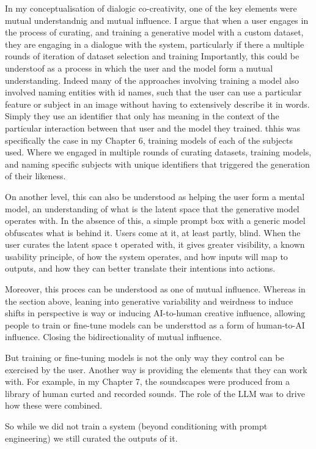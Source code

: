 In my conceptualisation of dialogic co-creativity, one of the key elements were mutual understandnig and mutual influence. I argue that when a user engages in the process of curating, and training a generative model with a custom dataset, they are engaging in a dialogue with the system, particularly if there a multiple rounds of iteration of dataset selection and training Importantly, this could be understoof as a process in which the user and the model form a mutual understanding. Indeed many of the approaches involving training a model also involved naming entities with id names, such that the user can use a particular feature or subject in an image without having to extensively describe it in words. Simply they use an identifier that only has meaning in the context of the particular interaction between that user and the model they trained. 
thhis was specifically the case in my Chapter 6, training models of each of the subjects used. Where we engaged in multiple rounds of curating datasets, training models, and naming specific subjects with unique identifiers that triggered the generation of their likeness. 

On another level, this can also be understood as helping the user form a mental model, an understanding of what is the latent space that the generative model operates with. In the absence of this, a simple prompt box with a generic model obfuscates what is behind it. Users come at it, at least partly, blind. When the user curates the latent space t operated with, it gives greater visibility, a known usability principle, of how  the system operates, and how inputs will map to outputs, and how they can better translate their intentions into actions. 

Moreover, this proces can be understood as one of mutual influence. Whereas in the section above, leaning into generative variability and weirdness to induce shifts in perspective is way or inducing AI-to-human creative influence, allowing people to train or fine-tune models can be understtod as a form of human-to-AI influence. Closing the bidirectionality of mutual influence. 

But training or fine-tuning models is not the only way they control can be exercised by the user. Another way is providing the elements that they can work with. For example, in my Chapter 7, the soundscapes were produced from a library of human curted and recorded sounds. The role of the LLM was to drive how these were combined. 

So while we did not train a system (beyond conditioning with prompt engineering) we still curated the outputs of it. 

